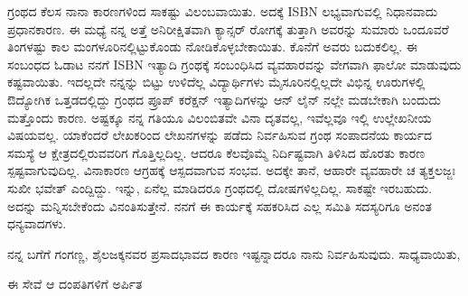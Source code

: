 {ಗ್ರಂಥದ ಕೆಲಸ ನಾನಾ ಕಾರಣಗಳಿಂದ ಸಾಕಷ್ಟು ವಿಲಂಬವಾಯಿತು. ಅದಕ್ಕೆ ISBN ಲಭ್ಯವಾಗುವಲ್ಲಿ ನಿಧಾನವಾದು ಪ್ರಧಾನಕಾರಣ. ಈ ಮಧ್ಯೆ ನನ್ನ ಅತ್ತೆ ಅನಿರೀಕ್ಷಿತವಾಗಿ ಕ್ಯಾನ್ಸರ್ ರೋಗಕ್ಕೆ ತುತ್ತಾಗಿ ಅವರನ್ನು ಸುಮಾರು ಒಂದೂವರೆ ತಿಂಗಳಷ್ಟು ಕಾಲ ಮಂಗಳೂರಿನಲ್ಲಿಟ್ಟುಕೊಂಡು ನೋಡಿಕೊಳ್ಳಬೇಕಾಯಿತು. ಕೊನೆಗೆ ಅವರು ಬದುಕಲಿಲ್ಲ. ಈ ಸಂಬಂಧದ ಓಡಾಟ ನನಗೆ ISBN ಇತ್ಯಾದಿ ಗ್ರಂಥಕ್ಕೆ ಸಂಬಂಧಿಸಿದ ವ್ಯವಹಾರವನ್ನು ವೇಗವಾಗಿ ಫಾಲೋ ಮಾಡುವುದು ಕಷ್ಟವಾಯಿತು. ಇದಲ್ಲದೇ ನನ್ನನ್ನು ಬಿಟ್ಟು ಉಳಿದೆಲ್ಲ ವಿದ್ಯಾರ್ಥಿಗಳು ಮೈಸೂರಿನಲ್ಲಿಲ್ಲದೇ ವಿಭಿನ್ನ ಊರುಗಳಲ್ಲಿ ಔದ್ಯೋಗಿಕ ಒತ್ತಡದಲ್ಲಿದ್ದು ಗ್ರಂಥದ ಪ್ರೂಪ್ ಕರೆಕ್ಷನ್ ಇತ್ಯಾದಿಗಳನ್ನು ಆನ್ ಲೈನ್ ನಲ್ಲೇ ಮಡಬೇಕಾಗಿ ಬಂದುದು ಮತ್ತೊಂದು ಕಾರಣ. ಅಷ್ಟಕ್ಕೂ ನನ್ನ ಗತಿಯೂ ವಿಲಂಬಿತವೇ ವಿನಾ ದೃತವಲ್ಲ, ಇವೆಲ್ಲವೂ ಇಲ್ಲಿ ಉಲ್ಲೇಖನೀಯ ವಿಷಯವಲ್ಲ. ಯಾಕೆಂದರೆ ಲೇಖಕರಿಂದ ಲೇಖನಗಳನ್ನು ಪಡೆದು ನಿರ್ವಹಿಸುವ ಗ್ರಂಥ ಸಂಪಾದನೆಯ ಕಾರ್ಯದ ಸಮಸ್ಯೆ ಆ ಕ್ಷೇತ್ರದಲ್ಲಿರುವವರಿಗ ಗೊತ್ತಿಲ್ಲದಿಲ್ಲ. ಆದರೂ ಕೆಲವೊಮ್ಮೆ ನಿರ್ದಿಷ್ಟವಾಗಿ ತಿಳಿಸಿದ ಹೊರತು ಕಾರಣ ಸ್ಪಷ್ಟವಾಗುವುದಿಲ್ಲ. ವಿನಾಕಾರಣ ಆಗ್ರಹಕ್ಕೆ ಆಸ್ಪದವಾಗುವ ಸಂಭವ. ಅದಕ್ಕೇ ತಾನೆ, ಆಹಾರೇ ವ್ಯವಹಾರೇ ಚ ತ್ಯಕ್ತಲಜ್ಜಃ ಸುಖೀ ಭವೇತ್ ಎಂದ್ದಿದ್ದು. ಇನ್ನು, ಏನೆಲ್ಲ ಮಾಡಿದರೂ ಗ್ರಂಥದಲ್ಲಿ ದೋಷಗಳಿಲ್ಲದಿಲ್ಲ. ಸಾಕಷ್ಟೇ ಇರಬಹುದು. ಅದನ್ನು ಮನ್ನಿಸಬೇಕೆಂದು ವಿನಂತಿಸುತ್ತೇನೆ. ನನಗೆ ಈ ಕಾರ್ಯಕ್ಕೆ ಸಹಕರಿಸಿದ ಎಲ್ಲ ಸಮಿತಿ ಸದಸ್ಯರಿಗೂ ಅನಂತ ಧನ್ಯವಾದಗಳು.

ನನ್ನ ಬಗೆಗೆ ಗಂಗಣ್ಣ, ಶೈಲಜಕ್ಕನವರ ಪ್ರಸಾದಭಾವದ ಕಾರಣ ಇಷ್ಟನ್ನಾದರೂ ನಾನು ನಿರ್ವಹಿಸುವುದು. ಸಾಧ್ಯವಾಯಿತು,

ಈ ಸೇವೆ ಆ ದಂಪತಿಗಳಿಗೆ ಅರ್ಪಿತ

\articleend
}
